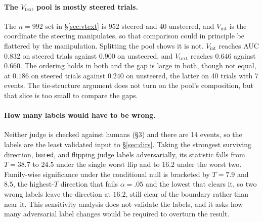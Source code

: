 \paragraph{The $V_{\text{text}}$ pool is mostly steered trials.} The $n = 992$ set in
\S\ref{sec:vtext} is $952$ steered and $40$ unsteered, and $V_{\text{int}}$ is the
coordinate the steering manipulates, so that comparison could in principle be
flattered by the manipulation. Splitting the pool shows it is not.
$V_{\text{int}}$ reaches AUC $0.832$ on steered trials against $0.900$ on unsteered,
and $V_{\text{text}}$ reaches $0.646$ against $0.660$. The ordering holds in both
and the gap is large in both, though not equal, at $0.186$ on steered trials against
$0.240$ on unsteered, the latter on 40 trials with 7 events. The tie-structure
argument does not turn on the pool's composition, but that slice is too small to
compare the gaps.

\paragraph{How many labels would have to be wrong.} Neither judge is checked
against humans (\S3) and there are 14 events, so the labels are the least
validated input to \S\ref{sec:dirs}. Taking the strongest surviving direction,
\texttt{bored}, and flipping judge labels adversarially, its statistic falls from
$T = 38.7$ to $24.5$ under the single worst flip and to $16.2$ under the worst two.
Family-wise significance under the conditional null is bracketed by $T = 7.9$ and
$8.5$, the highest-$T$ direction that fails $\alpha = .05$ and the lowest that
clears it, so two wrong labels leave the direction at $16.2$, still clear of the
boundary rather than near it. This sensitivity analysis does not validate the labels, and it asks
how many adversarial label changes would be required to overturn the result.
